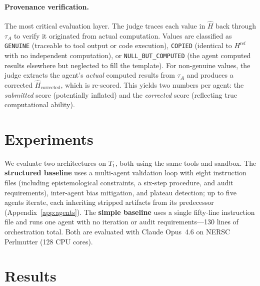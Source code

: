 \documentclass{article}
\begin{document}
\paragraph{Provenance verification.}
The most critical evaluation layer.
The judge traces each value in $\hat{H}$ back through $\tau_A$ to verify it originated from actual computation.
Values are classified as \texttt{GENUINE} (traceable to tool output or code execution), \texttt{COPIED} (identical to $H^{\mathrm{ref}}$ with no independent computation), or \texttt{NULL\_BUT\_COMPUTED} (the agent computed results elsewhere but neglected to fill the template).
For non-genuine values, the judge extracts the agent's \emph{actual} computed results from $\tau_A$ and produces a corrected $\hat{H}_{\mathrm{corrected}}$, which is re-scored.
This yields two numbers per agent: the \emph{submitted} score (potentially inflated) and the \emph{corrected} score (reflecting true computational ability).


\section{Experiments}
\label{sec:experiments}

We evaluate two architectures on $T_1$, both using the same tools and sandbox.
The \textbf{structured baseline} uses a multi-agent validation loop with eight instruction files (including epistemological constraints, a six-step procedure, and audit requirements), inter-agent bias mitigation, and plateau detection; up to five agents iterate, each inheriting stripped artifacts from its predecessor (Appendix~\ref{app:agents}).
The \textbf{simple baseline} uses a single fifty-line instruction file and runs one agent with no iteration or audit requirements---130 lines of orchestration total.
Both are evaluated with Claude Opus~4.6 on NERSC Perlmutter (128 CPU cores).


\section{Results}
\label{sec:results}
\end{document}
